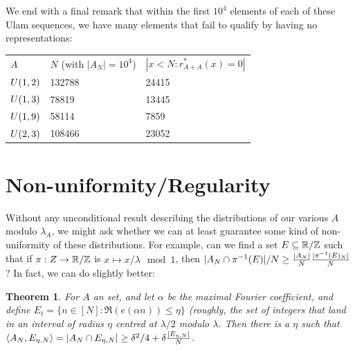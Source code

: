 \documentclass{report}
\newtheorem{theorem}{Theorem}[section]
\newtheorem{definition}[theorem]{Definition}
\theoremstyle{remark}
\numberwithin{equation}{section}
\begin{document}
We end with a final remark that within the first $10^4$ elements of
each of these Ulam sequences, we have many elements that fail to
qualify by having no representations:

\begin{tabular}{|lll|}
\hline
$A$ & $N$ (with $|A_N| = 10^4$) & $|x < N : r^*_{A+A}(x) = 0|$\\
$U(1,2)$ & 132788 & 24415\\
$U(1,3)$ & 78819 & 13445\\
$U(1,9)$ & 58114 & 7859\\
$U(2,3)$ & 108466 & 23052\\\hline
\end{tabular}

\section{Non-uniformity/Regularity}


Without any unconditional result describing the distributions of our
various $A$ modulo $\lambda_A$, we might ask whether we can at least
guarantee some kind of non-uniformity of these distributions.  For
example, can we find a set $E \subseteq \mathbb{R}/\mathbb{Z}$ such that if
$\pi : Z \to \mathbb{R}/\mathbb{Z}$ is $x \mapsto x/\lambda \mod{1}$, then
$|A_N \cap \pi^{-1}(E)|/N \geq
\frac{|A_N|}{N}\frac{|\pi^{-1}(E)_N|}{N}$?  In fact, we can do slightly
better:

\begin{theorem}\label{thm:regularity}
  For $A$ an \relevant set, and let $\alpha$ be the maximal Fourier
  coefficient, and define
  $E_{t} = \{n \in [N] : \Re(e(\alpha n)) \leq \eta\}$ (roughly, the
  set of integers that land in an interval of radius $\eta$ centred at
  $\lambda/2$ modulo $\lambda$.  Then there is a $\eta$ such that
  $\left<A_N, E_{\eta,N}\right> = |A_N \cap E_{\eta,N}| \geq \delta^2/4 +
  \delta \frac{|E_{\eta,N}|}{N}$.
\end{theorem}
\end{document}
